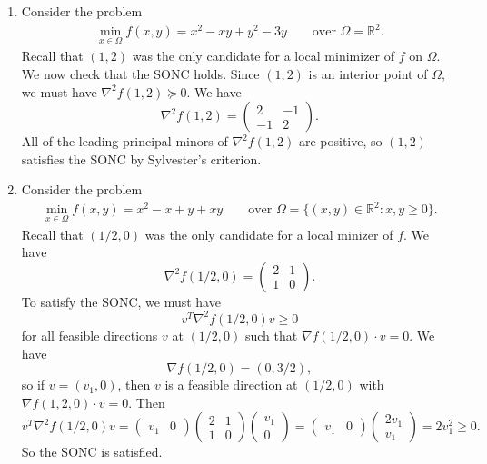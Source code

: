 \documentclass[11pt]{article}
\newcommand{\R}{\mathbb{R}}
\begin{document}
\begin{enumerate}
\item 
Consider the problem
\begin{align*}
\min_{x \in \Omega} f(x,y) = x^2 - xy + y^2 - 3y \qquad \text{over } \Omega = \R^2.
\end{align*}
Recall that $(1,2)$ was the only candidate for a local minimizer of $f$ on $\Omega$. We now check that the SONC holds. Since $(1,2)$ is an interior point of $\Omega$, we must have $\nabla^2 f(1,2) \succeq 0$. We have
\[
\nabla^2 f(1,2) = \begin{pmatrix}
2 & -1 \\ -1 & 2
\end{pmatrix}.
\]
All of the leading principal minors of $\nabla^2 f(1,2)$ are positive, so $(1,2)$ satisfies the SONC by Sylvester's criterion. 

\item 
Consider the problem
\begin{align*}
\min_{x \in \Omega} f(x,y) = x^2 - x + y + xy \qquad \text{over } \Omega = \{(x,y) \in \R^2 : x,y \geq 0\}.
\end{align*}
Recall that $(1/2, 0)$ was the only candidate for a local minizer of $f$. We have
\[
\nabla^2 f(1/2, 0) = \begin{pmatrix}
2 & 1 \\
1 & 0
\end{pmatrix}.
\]
To satisfy the SONC, we must have 
\[
v^T \nabla^2 f(1/2, 0) v \geq 0
\] 
for all feasible directions $v$ at $(1/2, 0)$ such that $\nabla f(1/2, 0) \cdot v = 0$. We have
\[
\nabla f(1/2, 0) = (0, 3/2),
\]
so if $v = (v_1, 0)$, then $v$ is a feasible direction at $(1/2, 0)$ with $\nabla f(1,2, 0) \cdot v = 0$. Then
\[
v^T \nabla^2 f(1/2, 0) v = \begin{pmatrix}
v_1 & 0
\end{pmatrix}\begin{pmatrix}
2 & 1 \\
1 & 0
\end{pmatrix}\begin{pmatrix}
v_1 \\ 0
\end{pmatrix} = \begin{pmatrix}
v_1 & 0
\end{pmatrix} \begin{pmatrix}
2v_1 \\ v_1
\end{pmatrix} = 2v_1^2 \geq 0.
\]
So the SONC is satisfied.
\end{enumerate}
\end{document}
